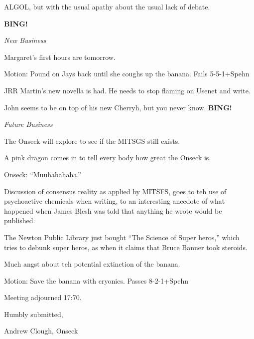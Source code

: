 \documentclass[12pt]{article}
\newcommand{\bing}{{\bf BING!} }
\newcommand{\goto}[1]{\bing \vskip 12pt \centerline{{\em{#1}}}}
\begin{document}
ALGOL, but with the usual apathy about the usual lack of debate.

\goto{New Business}

Margaret's first hours are tomorrow.

Motion: Pound on Jays back until she coughs up the banana.  Fails 5-5-1+Spehn

JRR Martin's new novella is had.  He needs to stop flaming on Usenet and write.

John seems to be on top of his new Cherryh, but you never know.
\goto{Future Business}

The Onseck will explore to see if the MITSGS still exists.

A pink dragon comes in to tell every body how great the Onseck is.

Onseck: ``Muuhahahaha.''

Discussion of consensus reality as applied by MITSFS, goes to teh use of psychoactive chemicals when writing, to an interesting anecdote of what happened when James Blesh was told that anything he wrote would be published.

The Newton Public Library just bought ``The Science of Super heros,'' which tries to debunk super heros, as when it claims that Bruce Banner took steroids.

Much angst about teh potential extinction of the banana.

Motion:  Save the banana with cryonics.  Passes 8-2-1+Spehn

\vspace{12pt}

\noindent
Meeting adjourned 17:70.

\vspace{18pt}

\centerline{Humbly submitted,}
\centerline{Andrew Clough, Onseck}
\end{document}
